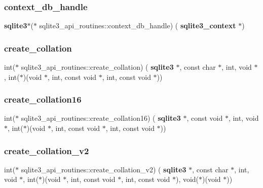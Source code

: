 \subsubsection{context\_db\_handle}
{\footnotesize\ttfamily \textbf{ sqlite3}$\ast$($\ast$ sqlite3\+\_\+api\+\_\+routines\+::context\+\_\+db\+\_\+handle) (\textbf{ sqlite3\+\_\+context} $\ast$)}

\mbox{\label{structsqlite3__api__routines_a923433105b84b919ea359ef320da55b1}} 
\subsubsection{create\_collation}
{\footnotesize\ttfamily int($\ast$ sqlite3\+\_\+api\+\_\+routines\+::create\+\_\+collation) (\textbf{ sqlite3} $\ast$, const char $\ast$, int, void $\ast$, int($\ast$)(void $\ast$, int, const void $\ast$, int, const void $\ast$))}

\mbox{\label{structsqlite3__api__routines_ab3fe60d5c018e3ffcad08bec34dc53e7}} 
\subsubsection{create\_collation16}
{\footnotesize\ttfamily int($\ast$ sqlite3\+\_\+api\+\_\+routines\+::create\+\_\+collation16) (\textbf{ sqlite3} $\ast$, const void $\ast$, int, void $\ast$, int($\ast$)(void $\ast$, int, const void $\ast$, int, const void $\ast$))}

\mbox{\label{structsqlite3__api__routines_a1e15da46f3dc62b421a8e3d84e83471c}} 
\subsubsection{create\_collation\_v2}
{\footnotesize\ttfamily int($\ast$ sqlite3\+\_\+api\+\_\+routines\+::create\+\_\+collation\+\_\+v2) (\textbf{ sqlite3} $\ast$, const char $\ast$, int, void $\ast$, int($\ast$)(void $\ast$, int, const void $\ast$, int, const void $\ast$), void($\ast$)(void $\ast$))}

